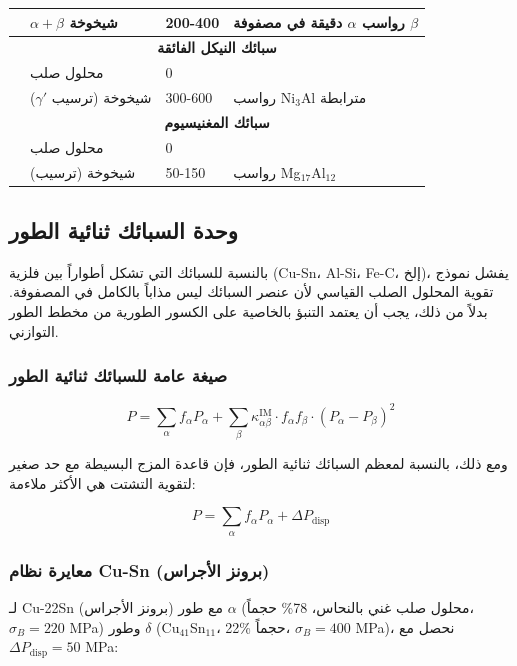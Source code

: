 \documentclass[11pt,a4paper]{article}
\begin{document}
\begin{otherlanguage}{arabic}
\begin{longtable}{p{3.5cm}p{3.0cm}p{3.0cm}p{4cm}}
			& \(\alpha+\beta\) شيخوخة & 200-400 & رواسب \(\alpha\) دقيقة في مصفوفة \(\beta\) \\
			\hline
			\multicolumn{4}{c}{\textbf{سبائك النيكل الفائقة}} \\
			& محلول صلب & 0 & \\
			& شيخوخة (ترسيب \(\gamma'\)) & 300-600 & رواسب Ni\(_3\)Al مترابطة \\
			\hline
			\multicolumn{4}{c}{\textbf{سبائك المغنيسيوم}} \\
			& محلول صلب & 0 & \\
			& شيخوخة (ترسيب) & 50-150 & رواسب Mg\(_{17}\)Al\(_{12}\) \\
			\bottomrule
		\end{longtable}
		
		\subsection{وحدة السبائك ثنائية الطور}
		\label{subsec:two-phase-alloys}
		
		بالنسبة للسبائك التي تشكل أطواراً بين فلزية (Cu-Sn، Al-Si، Fe-C، إلخ)، يفشل نموذج تقوية المحلول الصلب القياسي لأن عنصر السبائك ليس مذاباً بالكامل في المصفوفة. بدلاً من ذلك، يجب أن يعتمد التنبؤ بالخاصية على الكسور الطورية من مخطط الطور التوازني.
		
		\subsubsection{صيغة عامة للسبائك ثنائية الطور}
		
		\begin{equation}
			\boxed{P = \sum_{\alpha} f_{\alpha} P_{\alpha} + \sum_{\beta} \kappa_{\alpha\beta}^{\text{IM}} \cdot f_{\alpha} f_{\beta} \cdot (P_{\alpha} - P_{\beta})^2}
			\label{eq:two-phase-alloy}
		\end{equation}
		
		ومع ذلك، بالنسبة لمعظم السبائك ثنائية الطور، فإن قاعدة المزج البسيطة مع حد صغير لتقوية التشتت هي الأكثر ملاءمة:
		
		\begin{equation}
			\boxed{P = \sum_{\alpha} f_{\alpha} P_{\alpha} + \Delta P_{\text{disp}}}
			\label{eq:two-phase-simple}
		\end{equation}
		
		\subsubsection{معايرة نظام Cu-Sn (برونز الأجراس)}
		لـ Cu-22Sn (برونز الأجراس) مع طور \(\alpha\) (محلول صلب غني بالنحاس، 78\% حجماً، \(\sigma_B=220\) MPa) وطور \(\delta\) (Cu\(_{41}\)Sn\(_{11}\)، 22\% حجماً، \(\sigma_B=400\) MPa)، نحصل مع \(\Delta P_{\text{disp}}=50\) MPa:
		

\end{otherlanguage}
\end{document}
